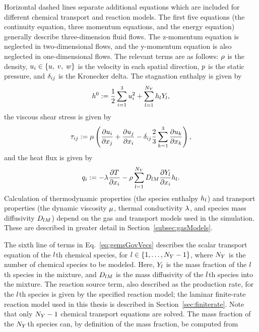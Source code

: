 Horizontal dashed lines separate additional equations which are included for different chemical transport and reaction models. The first five equations (the continuity equation, three momentum equations, and the energy equation) generally describe three-dimension fluid flows. The z-momentum equation is neglected in two-dimensional flows, and the y-momentum equation is also neglected in one-dimensional flows. The relevant terms are as follows: $\rho$ is the density, $u_{i} \in \{u, \; v, \; w\}$ is the velocity in each spatial direction, $p$ is the static pressure, and $\delta_{i j}$ is the Kronecker delta. The stagnation enthalpy is given by
\begin{equation}\label{eq:stagEnth}
	h^0 := \frac{1}{2} \sum_{i=1}^3 u_{i}^2 + \sum_{l = 1}^{N_Y} h_{l} Y_{l},
\end{equation}
the viscous shear stress is given by
\begin{equation}\label{eq:shearStress}
	\tau_{i j} := \mu \left( \frac{\partial u_{i}}{\partial x_{j}} + \frac{\partial u_{j}}{\partial x_{i}} - \delta_{i j} \frac{2}{3} \sum_{k=1}^3 \frac{\partial u_{k}}{\partial x_{k}} \right),
\end{equation}
and the heat flux is given by
\begin{equation}\label{eq:heatFlux}
	q_{i} := -\lambda \frac{\partial T}{\partial x_{i}} - \rho \sum_{l = 1}^{N_Y} D_{l M} \frac{\partial Y_{l}}{\partial x_{i}} h_{l}.
\end{equation}
Calculation of thermodynamic properties (the species enthalpy $h_{l}$) and transport properties (the dynamic viscosity $\mu$, thermal conductivity $\lambda$, and species mass diffusivity $D_{l M}$) depend on the gas and transport models used in the simulation. These are described in greater detail in Section~\ref{subsec:gasModels}.

The sixth line of terms in Eq.~\ref{eq:gemsGovVecs} describes the scalar transport equation of the $l$th chemical species, for $l \in \{1, \hdots, N_Y - 1\}$, where $N_Y$ is the number of chemical species to be modeled. Here, $Y_{l}$ is the mass fraction of the $l$th species in the mixture, and $D_{l M}$ is the mass diffusivity of the $l$th species into the mixture. The reaction source term, also described as the production rate, for the $l$th species is given by the specified reaction model; the laminar finite-rate reaction model used in this thesis is described in Section~\ref{sec:finiterate}. Note that only $N_Y - 1$ chemical transport equations are solved. The mass fraction of the $N_Y$th species can, by definition of the mass fraction, be computed from

